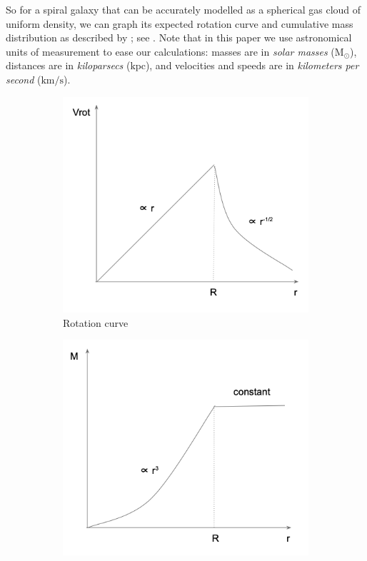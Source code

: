 \documentclass{article}
\newcommand\solmass{\textrm{M}_\odot}
\newcommand\kpc{\textrm{kpc}}
\newcommand\kmps{\textrm{km}/\textrm{s}}
\begin{document}
So for a spiral galaxy that can be accurately modelled as a spherical gas cloud of uniform density, we can graph its expected rotation curve and cumulative mass distribution as described by ; see .
Note that in this paper we use astronomical units of measurement to ease our calculations: masses are in \textit{solar masses} (\(\solmass\)), distances are in \textit{kiloparsecs} (\(\kpc\)), and velocities and speeds are in \textit{kilometers per second} (\(\kmps\)).

\begin{figure}
    \centering
    \begin{subfigure}{0.4\textwidth}
        \includegraphics[width=\textwidth]{VROT}
        \caption{Rotation curve}
    \end{subfigure}
    \hfill
    \begin{subfigure}{0.4\textwidth}
        \includegraphics[width=\textwidth]{M}

\end{subfigure}
\end{figure}
\end{document}
